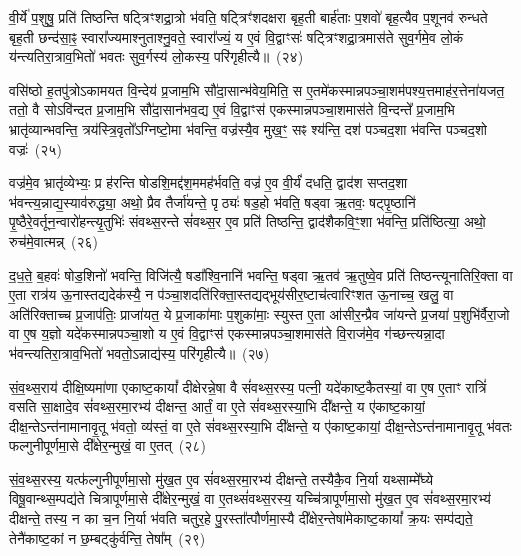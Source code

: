 वी॒र्ये॑ प॒शुषु॒ प्रति॑ तिष्ठन्ति षट्त्रिꣳशद्रा॒त्रो भ॑वति॒ षट्त्रिꣳ॑शदक्षरा बृह॒ती बार्\mbox{}ह॑ताः प॒शवो॑ बृह॒त्यैव प॒शूनव॑ रुन्धते बृह॒ती छन्द॑सा॒ꣴ॒ स्वारा᳚ज्यमाश्नुताश्नु॒वते॒ स्वारा᳚ज्यं॒ य ए॒वं वि॒द्वाꣳसः॑ षट्त्रिꣳशद्रा॒त्रमास॑ते सुव॒र्गमे॒व लो॒कं य॑न्त्यतिरा॒त्राव॒भितो॑ भवतः सुव॒र्गस्य॑ लो॒कस्य॒ परि॑गृहीत्यै॥~(२४)

{\anuvakamend[{अ॒ति॒रा॒त्र ओज॑स्ये॒व षट्त्रिꣳ॑शच्च}]}%

वसि॑ष्ठो ह॒तपु॑त्रो\-ऽकामयत वि॒न्देय॑ प्र॒जाम॒भि सौ॑दा॒सान्भ॑वेय॒मिति॒ स ए॒तमे॑कस्मान्नपञ्चा॒शम॑पश्य॒त्तमाह॑र॒त्तेना॑यजत॒ ततो॒ वै सो\-ऽवि॑न्दत प्र॒जाम॒भि सौ॑दा॒सान॑भव॒द्य ए॒वं वि॒द्वाꣳस॑ एकस्मान्नपञ्चा॒शमास॑ते वि॒न्दन्ते᳚ प्र॒जाम॒भि भ्रातृ॑व्यान्भवन्ति॒ त्रय॑स्त्रि॒वृतो᳚\-ऽग्निष्टो॒मा भ॑वन्ति॒ वज्र॑स्यै॒व मुख॒ꣳ॒ सꣴ श्य॑न्ति॒ दश॑ पञ्चद॒शा भ॑वन्ति पञ्चद॒शो वज्रः॑~(२५)

वज्र॑मे॒व भ्रातृ॑व्येभ्यः॒ प्र ह॑रन्ति षोडशि॒मद्द॑श॒ममह॑र्भवति॒ वज्र॑ ए॒व वी॒र्यं॑ दधति॒ द्वाद॑श सप्तद॒शा भ॑वन्त्य॒न्नाद्य॒स्याव॑रुद्ध्या॒ अथो॒ प्रैव तैर्जा॑यन्ते॒ पृठ्यः॑ षड॒हो भ॑वति॒ षड्वा ऋ॒तवः॒ षट्पृ॒ष्ठानि॑ पृ॒ष्ठैरे॒वर्तून॒न्वारो॑हन्त्यृ॒तुभिः॑ संवथ्स॒रन्ते सं॑वथ्स॒र ए॒व प्रति॑ तिष्ठन्ति॒ द्वाद॑शैकवि॒ꣳ॒शा भ॑वन्ति॒ प्रति॑ष्ठित्या॒ अथो॒ रुच॑मे॒वात्मन्न्~(२६)

द॒ध॒ते॒ ब॒हवः॑ षोड॒शिनो॑ भवन्ति॒ विजि॑त्यै॒ षडा᳚श्वि॒नानि॑ भवन्ति॒ षड्वा ऋ॒तव॑ ऋ॒तुष्वे॒व प्रति॑ तिष्ठन्त्यूनातिरि॒क्ता वा ए॒ता रात्र॑य ऊ॒नास्तद्यदेक॑स्यै॒ न प॑ञ्चा॒शदति॑रिक्ता॒स्तद्यद्भूय॑सीर॒ष्टाच॑त्वारिꣳशत ऊ॒नाच्च॒ खलु॒ वा अति॑रिक्ताच्च प्र॒जा\-प॑तिः॒ प्राजा॑यत॒ ये प्र॒जाका॑माः प॒शुका॑माः॒ स्युस्त ए॒ता आ॑सीर॒न्प्रैव जा॑यन्ते प्र॒जया॑ प॒शुभि॑र्वैरा॒जो वा ए॒ष य॒ज्ञो यदे॑कस्मान्नपञ्चा॒शो य ए॒वं वि॒द्वाꣳस॑ एकस्मान्नपञ्चा॒शमास॑ते वि॒राज॑मे॒व ग॑च्छन्त्यन्ना॒दा भ॑वन्त्यतिरा॒त्राव॒भितो॑ भवतो॒\-ऽन्नाद्य॑स्य॒ परि॑गृहीत्यै॥~(२७)

{\anuvakamend[{वज्र॑ आ॒त्मन्प्र॒जया॒ द्वाविꣳ॑शतिश्च}]}%

सं॒व॒थ्स॒राय॑ दीक्षि॒ष्यमा॑णा एकाष्ट॒कायां᳚ दीक्षेरन्ने॒षा वै सं॑वथ्स॒रस्य॒ पत्नी॒ यदे॑काष्ट॒कैतस्यां॒ वा ए॒ष ए॒ताꣳ रात्रिं॑ वसति सा॒क्षादे॒व सं॑वथ्स॒रमा॒रभ्य॑ दीक्षन्त॒ आर्तं॒ वा ए॒ते सं॑वथ्स॒रस्या॒भि दी᳚क्षन्ते॒ य ए॑काष्ट॒कायां॒ दीक्ष॒न्ते\-ऽन्त॑नामानावृ॒तू भ॑वतो॒ व्य॑स्तं॒ वा ए॒ते सं॑वथ्स॒रस्या॒भि दी᳚क्षन्ते॒ य ए॑काष्ट॒कायां॒ दीक्ष॒न्ते\-ऽन्त॑नामानावृ॒तू भ॑वतः फल्गुनीपूर्णमा॒से दी᳚क्षेर॒न्मुखं॒ वा ए॒तत्~(२८)

सं॒व॒थ्स॒रस्य॒ यत्फ॑ल्गुनीपूर्णमा॒सो मु॑ख॒त ए॒व सं॑वथ्स॒रमा॒रभ्य॑ दीक्षन्ते॒ तस्यैकै॒व नि॒र्या यथ्साम्मे᳚घ्ये विषू॒वान्थ्स॒म्पद्य॑ते चित्रापूर्णमा॒से दी᳚क्षेर॒न्मुखं॒ वा ए॒तथ्सं॑वथ्स॒रस्य॒ यच्चि॑त्रापूर्णमा॒सो मु॑ख॒त ए॒व सं॑वथ्स॒रमा॒रभ्य॑ दीक्षन्ते॒ तस्य॒ न का च॒न नि॒र्या भ॑वति चतुर॒हे पु॒रस्ता᳚त्पौर्णमा॒स्यै दी᳚क्षेर॒न्तेषा॑मेकाष्ट॒कायां᳚ क्र॒यः सम्प॑द्यते॒ तेनै॑काष्ट॒कां न छ॒म्बट्कु॑र्वन्ति॒ तेषा᳚म्~(२९)

